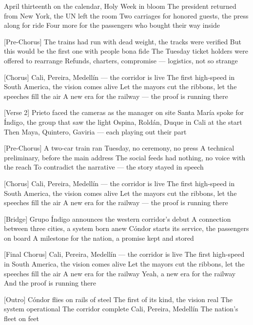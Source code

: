 \begin{lyrics}
[Verse 1]
April thirteenth on the calendar, Holy Week in bloom
The president returned from New York, the UN left the room
Two carriages for honored guests, the press along for ride
Four more for the passengers who bought their way inside

[Pre-Chorus]
The trains had run with dead weight, the tracks were verified
But this would be the first one with people bona fide
The Tuesday ticket holders were offered to rearrange
Refunds, charters, compromise — logistics, not so strange

[Chorus]
Cali, Pereira, Medellín — the corridor is live
The first high-speed in South America, the vision comes alive
Let the mayors cut the ribbons, let the speeches fill the air
A new era for the railway — the proof is running there

[Verse 2]
Prieto faced the cameras as the manager on site
Santa María spoke for Índigo, the group that saw the light
Ospina, Roldán, Duque in Cali at the start
Then Maya, Quintero, Gaviria — each playing out their part

[Pre-Chorus]
A two-car train ran Tuesday, no ceremony, no press
A technical preliminary, before the main address
The social feeds had nothing, no voice with the reach
To contradict the narrative — the story stayed in speech

[Chorus]
Cali, Pereira, Medellín — the corridor is live
The first high-speed in South America, the vision comes alive
Let the mayors cut the ribbons, let the speeches fill the air
A new era for the railway — the proof is running there

[Bridge]
Grupo Índigo announces the western corridor's debut
A connection between three cities, a system born anew
Cóndor starts its service, the passengers on board
A milestone for the nation, a promise kept and stored

[Final Chorus]
Cali, Pereira, Medellín — the corridor is live
The first high-speed in South America, the vision comes alive
Let the mayors cut the ribbons, let the speeches fill the air
A new era for the railway
Yeah, a new era for the railway
And the proof is running there

[Outro]
Cóndor flies on rails of steel
The first of its kind, the vision real
The system operational
The corridor complete
Cali, Pereira, Medellín
The nation's fleet on feet
\end{lyrics}

